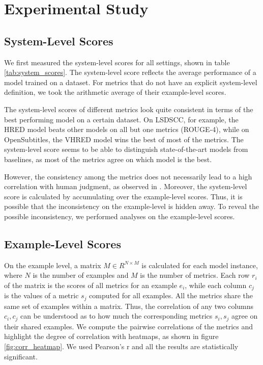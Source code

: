 \documentclass[runningheads]{llncs}
\begin{document}
    \section{Experimental Study}
    \subsection{System-Level Scores}
    We first measured the system-level scores for all settings, shown in table \ref{tab:system_scores}. The system-level score reflects the average performance of a model trained on a dataset. For metrics that do not have an explicit system-level definition, we took the arithmetic average of their example-level scores.
    

    The system-level scores of different metrics look quite consistent in terms of the best performing model on a certain dataset. On LSDSCC, for example, the HRED model beats other models on all but one metrics (ROUGE-4), while on OpenSubtitles, the VHRED model wins the best of most of the metrics. The system-level score seems to be able to distinguish state-of-the-art models from baselines, as most of the metrics agree on which model is the best.

    However, the consistency among the metrics does not necessarily lead to a high correlation with human judgment, as observed in \cite{HowNot}. Moreover, the system-level score is calculated by accumulating over the example-level scores. Thus, it is possible that the inconsistency on the example-level is hidden away. To reveal the possible inconsistency, we performed analyses on the example-level scores.

    \subsection{Example-Level Scores}
    
    On the example level, a matrix $M \in R^{N \times M}$ is calculated for each model instance, where $N$ is the number of examples and $M$ is the number of metrics. Each row $r_i$ of the matrix is the scores of all metrics for an example $e_i$, while each column $c_j$ is the values of a metric $s_j$ computed for all examples. All the metrics share the same set of examples within a matrix. Thus, the correlation of any two columns $c_i, c_j$ can be understood as to how much the corresponding metrics $s_i, s_j$ agree on their shared examples. We compute the pairwise correlations of the metrics and highlight the degree of correlation with heatmaps, as shown in figure \ref{fig:corr_heatmap}. We used Pearson's r and all the results are statistically significant.
\end{document}
